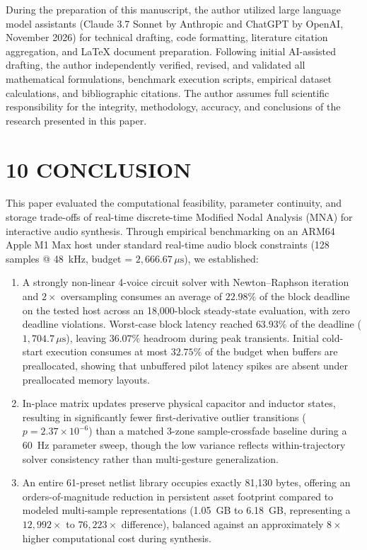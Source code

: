 \documentclass[fleqn,draft]{jaes}
\begin{document}
During the preparation of this manuscript, the author utilized large language model assistants (Claude 3.7 Sonnet by Anthropic and ChatGPT by OpenAI, November 2026) for technical drafting, code formatting, literature citation aggregation, and LaTeX document preparation. Following initial AI-assisted drafting, the author independently verified, revised, and validated all mathematical formulations, benchmark execution scripts, empirical dataset calculations, and bibliographic citations. The author assumes full scientific responsibility for the integrity, methodology, accuracy, and conclusions of the research presented in this paper.

\section{10 CONCLUSION}

This paper evaluated the computational feasibility, parameter continuity, and storage trade-offs of real-time discrete-time Modified Nodal Analysis (MNA) for interactive audio synthesis. Through empirical benchmarking on an ARM64 Apple M1 Max host under standard real-time audio block constraints (128 samples @ 48~kHz, budget = $2,666.67\,\mu\text{s}$), we established:
\begin{enumerate}
\item A strongly non-linear 4-voice circuit solver with Newton--Raphson iteration and $2\times$ oversampling consumes an average of $22.98\%$ of the block deadline on the tested host across an 18,000-block steady-state evaluation, with zero deadline violations. Worst-case block latency reached $63.93\%$ of the deadline ($1,704.7\,\mu\text{s}$), leaving $36.07\%$ headroom during peak transients. Initial cold-start execution consumes at most $32.75\%$ of the budget when buffers are preallocated, showing that unbuffered pilot latency spikes are absent under preallocated memory layouts.
\item In-place matrix updates preserve physical capacitor and inductor states, resulting in significantly fewer first-derivative outlier transitions ($p = 2.37 \times 10^{-6}$) than a matched 3-zone sample-crossfade baseline during a 60~Hz parameter sweep, though the low variance reflects within-trajectory solver consistency rather than multi-gesture generalization.
\item An entire 61-preset netlist library occupies exactly 81,130 bytes, offering an orders-of-magnitude reduction in persistent asset footprint compared to modeled multi-sample representations (1.05~GB to 6.18~GB, representing a $12,992\times$ to $76,223\times$ difference), balanced against an approximately $8\times$ higher computational cost during synthesis.
\end{enumerate}
\end{document}
